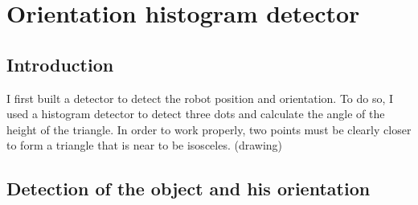 \section{Orientation histogram detector}

\subsection{Introduction}

    I first built a detector to detect the robot position and orientation. 
    To do so, I used a histogram detector to detect three dots and calculate
    the angle of the height of the triangle. In order to work properly, two 
    points must be clearly closer to form a triangle that is near to be 
    isosceles. (drawing)

\subsection{Detection of the object and his orientation}



